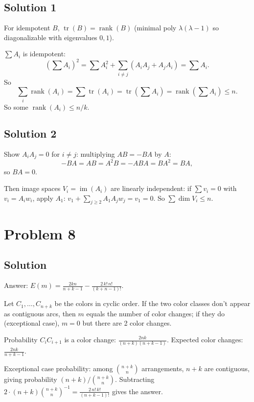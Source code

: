 \documentclass{article}
\begin{document}
\subsection*{Solution 1}
For idempotent $B$, $\operatorname{tr}(B) = \operatorname{rank}(B)$ (minimal poly $\lambda(\lambda-1)$ so diagonalizable with eigenvalues $0,1$).

$\sum A_i$ is idempotent:
\[ \left(\sum A_i\right)^2 = \sum A_i^2 + \sum_{i \neq j}(A_i A_j + A_j A_i) = \sum A_i. \]
So
\[ \sum_i \operatorname{rank}(A_i) = \sum \operatorname{tr}(A_i) = \operatorname{tr}\!\left(\sum A_i\right) = \operatorname{rank}\!\left(\sum A_i\right) \leq n. \]
So some $\operatorname{rank}(A_i) \leq n/k$.

\subsection*{Solution 2}
Show $A_i A_j = 0$ for $i \neq j$: multiplying $AB = -BA$ by $A$:
\[ -BA = AB = A^2 B = -ABA = BA^2 = BA, \]
so $BA = 0$.

Then image spaces $V_i = \operatorname{im}(A_i)$ are linearly independent: if $\sum v_i = 0$ with $v_i = A_i w_i$, apply $A_1$: $v_1 + \sum_{j\geq 2} A_1 A_j w_j = v_1 = 0$. So $\sum \dim V_i \leq n$.

\section*{Problem 8}
\subsection*{Solution}
Answer: $\displaystyle E(m) = \frac{2kn}{n+k-1} - \frac{2\, k!\, n!}{(k+n-1)!}$.

Let $C_1, \ldots, C_{n+k}$ be the colors in cyclic order. If the two color classes don't appear as contiguous arcs, then $m$ equals the number of color changes; if they do (exceptional case), $m = 0$ but there are 2 color changes.

Probability $C_i C_{i+1}$ is a color change: $\frac{2nk}{(n+k)(n+k-1)}$. Expected color changes: $\frac{2nk}{n+k-1}$.

Exceptional case probability: among $\binom{n+k}{n}$ arrangements, $n+k$ are contiguous, giving probability $(n+k)/\binom{n+k}{n}$. Subtracting $2 \cdot (n+k) \binom{n+k}{n}^{-1} = \frac{2\, n!\, k!}{(n+k-1)!}$ gives the answer.
\end{document}
